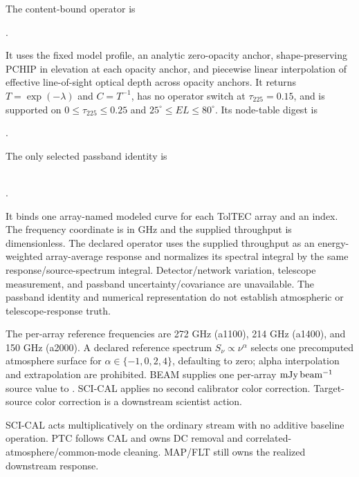  The content-bound operator is
\begin{center}\small
{}.
\end{center}
It uses the fixed
 model profile, an analytic zero-opacity anchor,
shape-preserving PCHIP in elevation at each opacity anchor, and piecewise
linear interpolation of effective line-of-sight optical depth across opacity
anchors. It returns \(T=\exp(-\lambda)\) and \(C=T^{-1}\), has no operator
switch at \(\tau_{225}=0.15\), and is supported on
\(0\leq\tau_{225}\leq0.25\) and \(25^\circ\leq EL\leq80^\circ\).
Its node-table digest is
\begin{center}\footnotesize
{}.
\end{center}

 The only selected passband identity is
\begin{center}
\small{}\\
.
\end{center}
It binds one array-named modeled curve for each TolTEC array and an index. The
frequency coordinate is in GHz and the supplied throughput is dimensionless.
The declared operator uses the supplied throughput as an energy-weighted
array-average response and normalizes its spectral integral by the same
response/source-spectrum integral. Detector/network variation, telescope
measurement, and passband uncertainty/covariance are unavailable. The
passband identity and numerical representation do not establish atmospheric
or telescope-response truth.

 The per-array reference frequencies are
272 GHz (a1100), 214 GHz (a1400), and 150 GHz (a2000). A declared reference
spectrum \(S_\nu\propto\nu^\alpha\) selects one precomputed atmosphere surface
for \(\alpha\in\{-1,0,2,4\}\), defaulting to zero; alpha interpolation and
extrapolation are prohibited. BEAM supplies one per-array \(\mathrm{mJy\,beam^{-1}}\) source
value to . SCI-CAL applies no second calibrator color
correction. Target-source color correction is a downstream scientist action.

 SCI-CAL acts multiplicatively on the
ordinary  stream with no additive baseline operation. PTC follows
CAL and owns DC removal and correlated-atmosphere/common-mode cleaning.
MAP/FLT still owns the realized downstream response.

